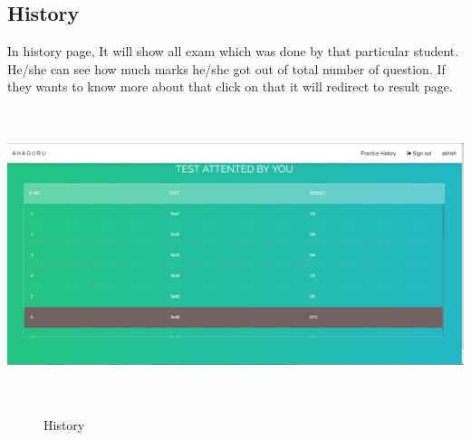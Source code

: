 \subsection{History}
In history page, It will show all exam which was done by that particular student. He/she can see how much marks he/she got out of total number of question. If they wants to know more about that click on that it will redirect to result page.
\begin{center}
	\includegraphics[width=13.5cm, height=8.5cm]{history.png}
	\begin{figure}[h!]
		\centering
		\caption{History}%
	\end{figure}
\end{center} \break
